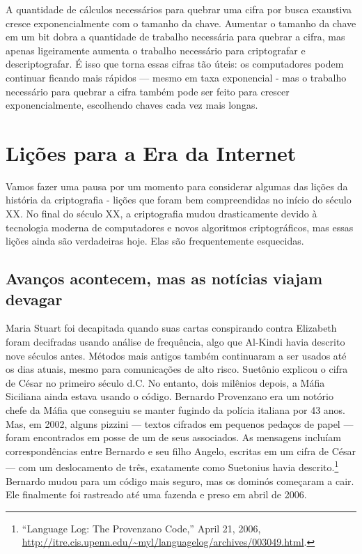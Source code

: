 \documentclass{book}
\begin{document}
A quantidade de cálculos necessários para quebrar uma cifra por busca exaustiva cresce exponencialmente com o tamanho da chave. Aumentar o tamanho da chave em um bit dobra a quantidade de trabalho necessária para quebrar a cifra, mas apenas ligeiramente aumenta o trabalho necessário para criptografar e descriptografar. É isso que torna essas cifras tão úteis: os computadores podem continuar ficando mais rápidos --- mesmo em taxa exponencial - mas o trabalho necessário para quebrar a cifra também pode ser feito para crescer exponencialmente, escolhendo chaves cada vez mais longas.


\section{Lições para a Era da Internet}
\label{segredos:licoes}

Vamos fazer uma pausa por um momento para considerar algumas das lições da história da criptografia - lições que foram bem compreendidas no início do século XX. No final do século XX, a criptografia mudou drasticamente devido à tecnologia moderna de computadores e novos algoritmos criptográficos, mas essas lições ainda são verdadeiras hoje. Elas são frequentemente esquecidas.

\subsection{Avanços acontecem, mas as notícias viajam devagar}
\label{segredos:avancos}

Maria Stuart foi decapitada quando suas cartas conspirando contra Elizabeth foram decifradas usando análise de frequência, algo que Al-Kindi havia descrito nove séculos antes. Métodos mais antigos também continuaram a ser usados até os dias atuais, mesmo para comunicações de alto risco. Suetônio explicou o cifra de César no primeiro século d.C. No entanto, dois milênios depois, a Máfia Siciliana ainda estava usando o código. Bernardo Provenzano era um notório chefe da Máfia que conseguiu se manter fugindo da polícia italiana por 43 anos. Mas, em 2002, alguns pizzini --- textos cifrados em pequenos pedaços de papel --- foram encontrados em posse de um de seus associados. As mensagens incluíam correspondências entre Bernardo e seu filho Angelo, escritas em um cifra de César --- com um deslocamento de três, exatamente como Suetonius havia descrito.\footnote{“Language Log: The Provenzano Code,” April 21, 2006, \url{http://itre.cis.upenn.edu/~myl/languagelog/archives/003049.html}.} Bernardo mudou para um código mais seguro, mas os dominós começaram a cair. Ele finalmente foi rastreado até uma fazenda e preso em abril de 2006.
\end{document}
